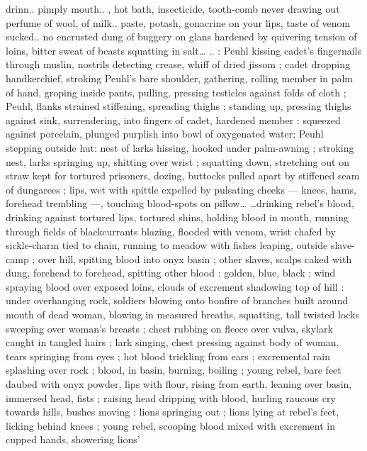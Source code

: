 \documentclass[10pt,twoside]{memoir}
\begin{document}
drinn.. pimply mouth.. , hot bath, insecticide, tooth-comb never 
drawing out perfume of wool, of milk.. paste, potash, gonacrine on 
your lips, taste of venom sucked.. no encrusted dung of buggery on 
glans hardened by quivering tension of loins, bitter sweat of beasts 
squatting in salt{\ldots} {\guillemotright}.. : Peuhl kissing cadet's fingernails through
muslin, nostrils detecting crease, whiff of dried jissom ; cadet 
dropping handkerchief, stroking Peuhl's bare shoulder, gathering, 
rolling member in palm of hand, groping inside pants, pulling, 
pressing testicles against folds of cloth ; Peuhl, flanks strained 
stiffening, spreading thighs ; standing up, pressing thighs against 
sink, surrendering, into fingers of cadet, hardened member : 
squeezed against porcelain, plunged purplish into bowl of 
oxygenated water; Peuhl stepping outside hut: nest of larks hissing, 
hooked under palm-awning ; stroking nest, larks springing up, 
shitting over wrist ; squatting down, stretching out on straw kept for 
tortured prisoners, dozing, buttocks pulled apart by stiffened seam 
of dungarees ; lips, wet with spittle expelled by pulsating cheeks --- 
knees, hams, forehead trembling ---, touching blood-spots on 
pillow{\ldots} {\guillemotleft} {\ldots}drinking rebel's blood, drinking against tortured lips, 
tortured shins, holding blood in mouth, running through fields of 
blackcurrants blazing, flooded with venom, wrist chafed by sickle-charm 
tied to chain, running to meadow with fishes leaping, outside 
slave-camp ; over hill, spitting blood into onyx basin ; other slaves, 
scalps caked with dung, forehead to forehead, spitting other blood : 
golden, blue, black ; wind spraying blood over exposed loins, clouds 
of excrement shadowing top of hill : under overhanging rock, 
soldiers blowing onto bonfire of branches built around mouth of 
dead woman, blowing in measured breaths, squatting, tall twisted 
locks sweeping over woman's breasts ; chest rubbing on fleece over 
vulva, skylark caught in tangled hairs ; lark singing, chest pressing 
against body of woman, tears springing from eyes ; hot blood 
trickling from ears ; excremental rain splashing over rock ; blood, in 
basin, burning, boiling ; young rebel, bare feet daubed with onyx 
powder, lips with flour, rising from earth, leaning over basin, 
immersed head, fists ; raising head dripping with blood, hurling 
raucous cry towards hills, bushes moving : lions springing out ; lions 
lying at rebel's feet, licking behind knees ; young rebel, scooping 
blood mixed with excrement in cupped hands, showering lions' 
\end{document}
